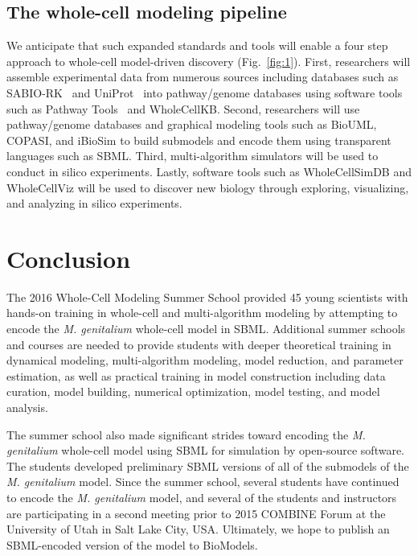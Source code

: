 \documentclass[journal,transmag]{IEEEtran}
\begin{document}
\subsection{The whole-cell modeling pipeline}
We anticipate that such expanded standards and tools will enable a four step approach to whole-cell model-driven discovery (Fig.~\ref{fig:1}). First, researchers will assemble experimental data from numerous sources including databases such as SABIO-RK~\cite{Wittig2012} and UniProt~\cite{UniProt2015} into pathway/genome databases using software tools such as Pathway Tools~\cite{Karp2010} and WholeCellKB. Second, researchers will use pathway/genome databases and graphical modeling tools such as BioUML, COPASI, and iBioSim to build submodels and encode them using transparent languages such as SBML. Third, multi-algorithm simulators will be used to conduct in silico experiments. Lastly, software tools such as WholeCellSimDB and WholeCellViz will be used to discover new biology through exploring, visualizing, and analyzing in silico experiments.

\section{Conclusion}
The 2016 Whole-Cell Modeling Summer School provided 45 young scientists with hands-on training in whole-cell and multi-algorithm modeling by attempting to encode the \textit{M. genitalium} whole-cell model in SBML. Additional summer schools and courses are needed to provide students with deeper theoretical training in dynamical modeling, multi-algorithm modeling, model reduction, and parameter estimation, as well as practical training in model construction including data curation, model building, numerical optimization, model testing, and model analysis.

The summer school also made significant strides toward encoding the \textit{M. genitalium} whole-cell model using SBML for simulation by open-source software. The students developed preliminary SBML versions of all of the submodels of the \textit{M. genitalium} model. Since the summer school, several students have continued to encode the \textit{M. genitalium} model, and several of the students and instructors are participating in a second meeting prior to 2015 COMBINE Forum at the University of Utah in Salt Lake City, USA. Ultimately, we hope to publish an SBML-encoded version of the model to BioModels. 
\end{document}
